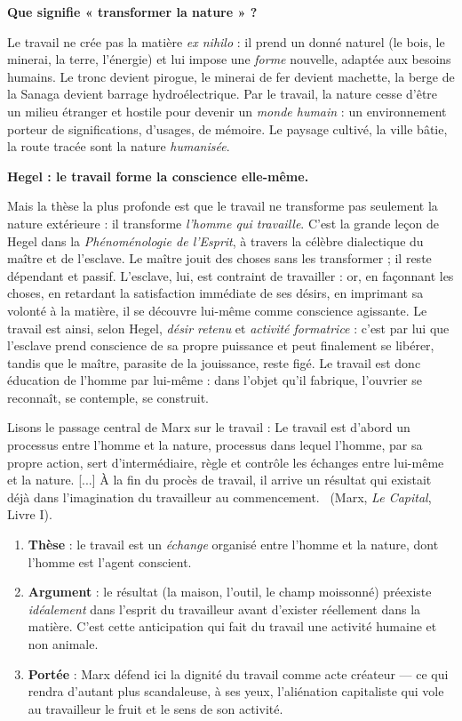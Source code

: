 \documentclass[11pt]{article}
\newcommand{\cle}[1]{{\popxbold\color{popdark}#1}}
\begin{document}
\textbf{Que signifie « transformer la nature » ?}\par
Le travail ne crée pas la matière \emph{ex nihilo} : il prend un donné naturel (le bois, le minerai, la terre, l'énergie) et lui impose une \emph{forme} nouvelle, adaptée aux besoins humains. Le tronc devient pirogue, le minerai de fer devient machette, la berge de la Sanaga devient barrage hydroélectrique. Par le travail, la nature cesse d'être un milieu étranger et hostile pour devenir un \emph{monde humain} : un environnement porteur de significations, d'usages, de mémoire. Le paysage cultivé, la ville bâtie, la route tracée sont la nature \emph{humanisée}.

\textbf{Hegel : le travail forme la conscience elle-même.}\par
Mais la thèse la plus profonde est que le travail ne transforme pas seulement la nature extérieure : il transforme \emph{l'homme qui travaille}. C'est la grande leçon de Hegel dans la \emph{Phénoménologie de l'Esprit}, à travers la célèbre dialectique du maître et de l'esclave. Le maître jouit des choses sans les transformer ; il reste dépendant et passif. L'esclave, lui, est contraint de travailler : or, en façonnant les choses, en retardant la satisfaction immédiate de ses désirs, en imprimant sa volonté à la matière, il se découvre lui-même comme conscience agissante. Le travail est ainsi, selon Hegel, \emph{désir retenu} et \emph{activité formatrice} : c'est par lui que l'esclave prend conscience de sa propre puissance et peut finalement se libérer, tandis que le maître, parasite de la jouissance, reste figé. Le travail est donc \cle{éducation de l'homme par lui-même} : dans l'objet qu'il fabrique, l'ouvrier se reconnaît, se contemple, se construit.

\begin{experience}
Lisons le passage central de Marx sur le travail : \guillemotleft Le travail est d'abord un processus entre l'homme et la nature, processus dans lequel l'homme, par sa propre action, sert d'intermédiaire, règle et contrôle les échanges entre lui-même et la nature. [...] À la fin du procès de travail, il arrive un résultat qui existait déjà dans l'imagination du travailleur au commencement. \guillemotright\ (Marx, \emph{Le Capital}, Livre I).
\begin{enumerate}
\item \textbf{Thèse} : le travail est un \emph{échange} organisé entre l'homme et la nature, dont l'homme est l'agent conscient.
\item \textbf{Argument} : le résultat (la maison, l'outil, le champ moissonné) préexiste \emph{idéalement} dans l'esprit du travailleur avant d'exister réellement dans la matière. C'est cette anticipation qui fait du travail une activité humaine et non animale.
\item \textbf{Portée} : Marx défend ici la dignité du travail comme acte créateur — ce qui rendra d'autant plus scandaleuse, à ses yeux, l'aliénation capitaliste qui vole au travailleur le fruit et le sens de son activité.
\end{enumerate}
\end{experience}
\end{document}
